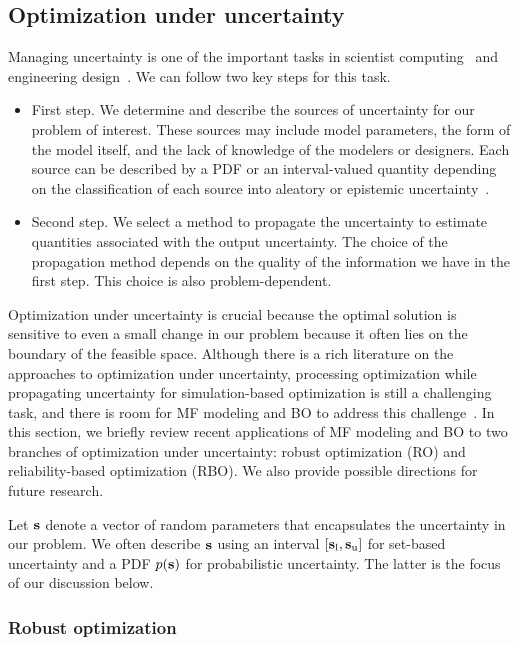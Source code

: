 \documentclass[iicol,sn-basic]{sn-jnl}%
\theoremstyle{thmstyleone}%
\theoremstyle{thmstyletwo}
\theoremstyle{thmstylethree}
\begin{document}
\begin{linenumbers}
\subsection{Optimization under uncertainty}\label{Sec73}

Managing uncertainty is one of the important tasks in scientist computing~\citep{Oberkampf2010,Roy2011} and engineering design~\citep{Beyer2007}.
We can follow two key steps for this task.
\begin{itemize}
	\item First step. We determine and describe the sources of uncertainty for our problem of interest. These sources may include model parameters, the form of the model itself, and the lack of knowledge of the modelers or designers. Each source can be described by a PDF or an interval-valued quantity depending on the classification of each source into aleatory or epistemic uncertainty~\citep{Roy2011}.  
	
	\item Second step. We select a method to propagate the uncertainty to estimate quantities associated with the output uncertainty.
	The choice of the propagation method depends on the quality of the information we have in the first step.
	This choice is also problem-dependent.
\end{itemize}

Optimization under uncertainty is crucial because the optimal solution is sensitive to even a small change in our problem because it often lies on the boundary of the feasible space.
Although there is a rich literature on the approaches to optimization under uncertainty, processing optimization while propagating uncertainty for simulation-based optimization is still a challenging task, and there is room for MF modeling and BO to address this challenge~\citep{Peherstorfer2018,Do2021}. 
In this section, we briefly review recent applications of MF modeling and BO to two branches of optimization under uncertainty: robust optimization (RO) and reliability-based optimization (RBO).
We also provide possible directions for future research.

Let ${\bf s}$ denote a vector of random parameters that encapsulates the uncertainty in our problem.
We often describe ${\bf s}$ using an interval $[{\bf s}_\text{l},{\bf s}_\text{u}]$ for set-based uncertainty and a PDF $p({\bf s})$ for probabilistic uncertainty.
The latter is the focus of our discussion below.
\subsubsection{Robust optimization}\label{Sec731}


\end{linenumbers}
\end{document}

